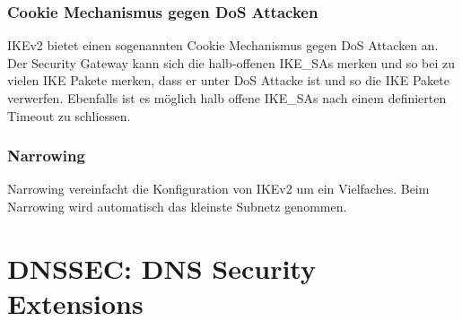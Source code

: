\subsubsection{Cookie Mechanismus gegen DoS Attacken}
IKEv2 bietet einen sogenannten Cookie Mechanismus gegen DoS Attacken an. Der Security Gateway kann sich die halb-offenen IKE\_SAs merken und so bei zu vielen IKE Pakete merken, dass er unter DoS Attacke ist und so die IKE Pakete verwerfen. Ebenfalls ist es möglich halb offene IKE\_SAs nach einem definierten Timeout zu schliessen.

\subsubsection{Narrowing}
Narrowing vereinfacht die Konfiguration von IKEv2 um ein Vielfaches. Beim Narrowing wird automatisch das kleinste Subnetz genommen.

\section{DNSSEC: DNS Security Extensions}

